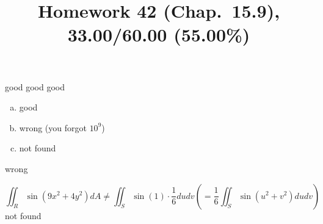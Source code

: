 \documentclass[pstricks,10pt,dvipsnames]{article} %
\title{Homework 42 (Chap.~15.9),
33.00/60.00 (55.00\%)
}
\begin{document}
\maketitle
{}
good
good
good
\begin{enumerate}[(a)]
	\item good
	\item wrong (you forgot $10^9$)
	\item not found
\end{enumerate}
wrong

\begin{equation*}
	\iint_{R}\sin\left( 9x^2+4y^2 \right)dA\neq\iint_S\sin(1)\cdot \frac{1}{6}dudv\left( 
	=\frac{1}{6}\iint_S\sin(u^2+v^2)dudv\right)
\end{equation*}
not found
\end{document}
